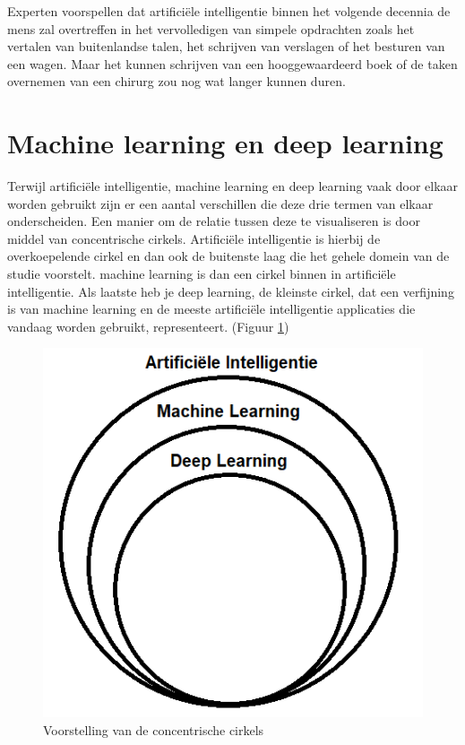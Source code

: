 Experten voorspellen dat artificiële intelligentie binnen het volgende decennia de mens zal overtreffen in het vervolledigen van simpele opdrachten zoals het vertalen van buitenlandse talen, het schrijven van verslagen of het besturen van een wagen. Maar het kunnen schrijven van een hooggewaardeerd boek of de taken overnemen van een chirurg zou nog wat langer kunnen duren. \autocite{Katja2018}



\section{Machine learning en deep learning}

Terwijl artificiële intelligentie, machine learning en deep learning vaak door elkaar worden gebruikt zijn er een aantal verschillen die deze drie termen van elkaar onderscheiden. Een manier om de relatie tussen deze te visualiseren is door middel van concentrische cirkels.
Artificiële intelligentie is hierbij de overkoepelende cirkel en dan ook de buitenste laag die het gehele domein van de studie voorstelt. machine learning is dan een cirkel binnen in artificiële intelligentie. Als laatste heb je deep learning, de kleinste cirkel, dat een verfijning is van machine learning en de meeste artificiële intelligentie applicaties die vandaag worden gebruikt, representeert. (Figuur \ref{tab:cirkels})

\begin{figure}
    \centering
    
    \includegraphics[scale=0.6]{img/cirkels.png}
    \caption{Voorstelling van de concentrische cirkels}
    \label{tab:cirkels}
\end{figure}

